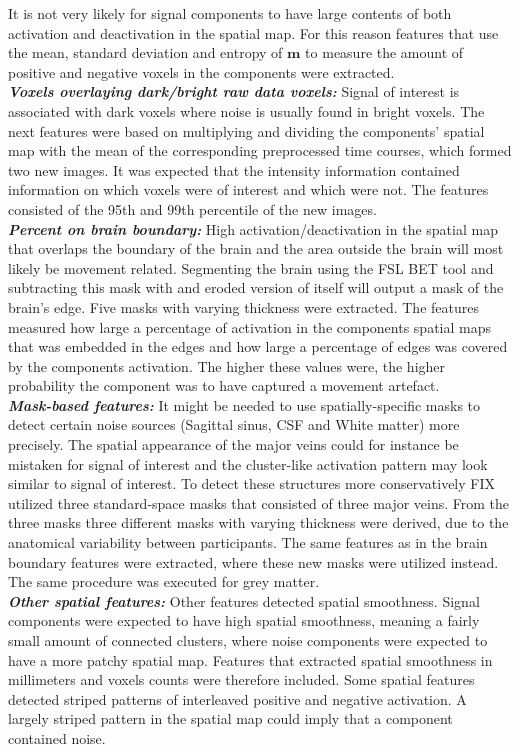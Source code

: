 It is not very likely for signal components to have large contents of both activation and deactivation in the spatial map. For this reason features that use the mean, standard deviation and entropy of $\mathbf{m}$ to measure the amount of positive and negative voxels in the components were extracted. \\
\textbf{\textit{Voxels overlaying dark/bright raw data voxels:}}
Signal of interest is associated with dark voxels where noise is usually found in bright voxels. The next features were based on multiplying and dividing the components’ spatial map with the mean of the corresponding preprocessed time courses, which formed two new images. It was expected that the intensity information contained information on which voxels were of interest and which were not. The features consisted of the 95th and 99th percentile of the new images. \\
\textbf{\textit{Percent on brain boundary:}} High activation/deactivation in the spatial map that overlaps the boundary of the brain and the area outside the brain will most likely be movement related. Segmenting the brain using the FSL BET tool and subtracting this mask with and eroded version of itself will output a mask of the brain’s edge. Five masks with varying thickness were extracted. The features measured how large a percentage of activation in the components spatial maps that was embedded in the edges and how large a percentage of edges was covered by the components activation. The higher these values were, the higher probability the component was to have captured a movement artefact. \\
\textbf{\textit{Mask-based features:}} It might be needed to use spatially-specific masks to detect certain noise sources (Sagittal sinus, CSF and White matter) more precisely. The spatial appearance of the major veins could for instance be mistaken for signal of interest and the cluster-like activation pattern may look similar to signal of interest. To detect these structures more conservatively FIX utilized three standard-space masks that consisted of three major veins. From the three masks three different masks with varying thickness were derived, due to the anatomical variability between participants. The same features as in the brain boundary features were extracted, where these new masks were utilized instead. The same procedure was executed for grey matter. \\
\textbf{\textit{Other spatial features:}} Other features detected spatial smoothness. Signal components were expected to have high spatial smoothness, meaning a fairly small amount of connected clusters, where noise components were expected to have a more patchy spatial map. Features that extracted spatial smoothness in millimeters and voxels counts were therefore included. Some spatial features detected striped patterns of interleaved positive and negative activation. A largely striped pattern in the spatial map could imply that a component contained noise. \cite{Salimi-Khorshidi2014}




